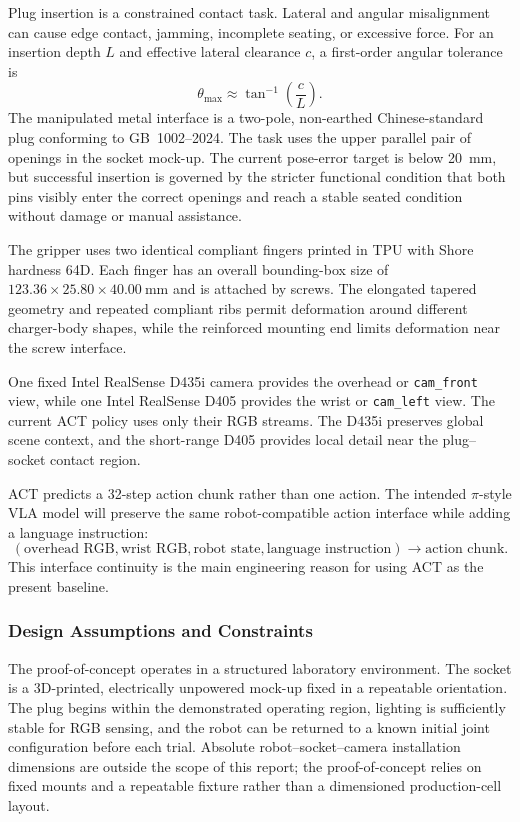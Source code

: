 \documentclass[12pt, letterpaper]{article}
\newcommand{\pistyle}{$\pi$-style}
\begin{document}
Plug insertion is a constrained contact task. Lateral and angular misalignment can cause edge contact, jamming, incomplete seating, or excessive force. For an insertion depth \(L\) and effective lateral clearance \(c\), a first-order angular tolerance is
\[
\theta_{\max}\approx\tan^{-1}\left(\frac{c}{L}\right).
\]
The manipulated metal interface is a two-pole, non-earthed Chinese-standard plug conforming to GB~1002--2024. The task uses the upper parallel pair of openings in the socket mock-up. The current pose-error target is below \SI{20}{\milli\metre}, but successful insertion is governed by the stricter functional condition that both pins visibly enter the correct openings and reach a stable seated condition without damage or manual assistance.

The gripper uses two identical compliant fingers printed in TPU with Shore hardness 64D. Each finger has an overall bounding-box size of \(123.36\times25.80\times40.00~\mathrm{mm}\) and is attached by screws. The elongated tapered geometry and repeated compliant ribs permit deformation around different charger-body shapes, while the reinforced mounting end limits deformation near the screw interface.

One fixed Intel RealSense D435i camera provides the overhead or \texttt{cam\_front} view, while one Intel RealSense D405 provides the wrist or \texttt{cam\_left} view. The current ACT policy uses only their RGB streams. The D435i preserves global scene context, and the short-range D405 provides local detail near the plug--socket contact region.

ACT predicts a 32-step action chunk rather than one action. The intended \pistyle{} VLA model will preserve the same robot-compatible action interface while adding a language instruction:
\[
(\text{overhead RGB},\text{wrist RGB},\text{robot state},
\text{language instruction})
\longrightarrow
\text{action chunk}.
\]
This interface continuity is the main engineering reason for using ACT as the present baseline.

\subsubsection{Design Assumptions and Constraints}

The proof-of-concept operates in a structured laboratory environment. The socket is a 3D-printed, electrically unpowered mock-up fixed in a repeatable orientation. The plug begins within the demonstrated operating region, lighting is sufficiently stable for RGB sensing, and the robot can be returned to a known initial joint configuration before each trial. Absolute robot--socket--camera installation dimensions are outside the scope of this report; the proof-of-concept relies on fixed mounts and a repeatable fixture rather than a dimensioned production-cell layout.
\end{document}
